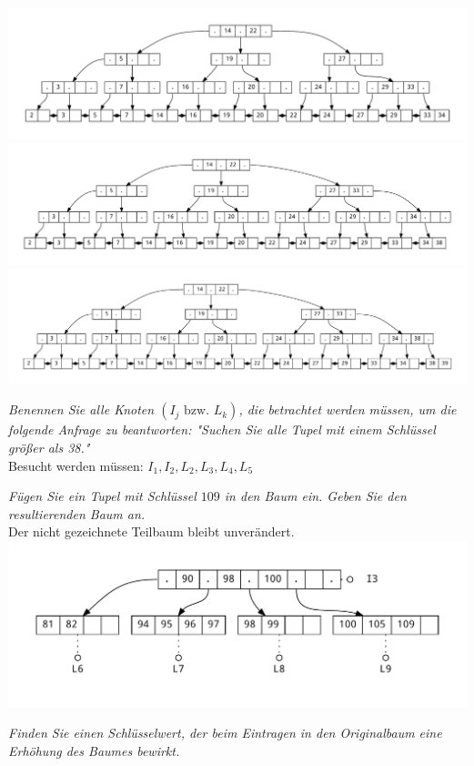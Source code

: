 \documentclass{uni_tue_template}
\begin{document}
  \includegraphics[scale=0.4]{./dot/A1_1-14.pdf}\\
  \includegraphics[scale=0.4]{./dot/A1_1-15.pdf}\\
  \includegraphics[scale=0.4]{./dot/A1_1-16.pdf}
\subExEnd{}
%
\newpage 
%
\exercise{}
  \item \emph{Benennen Sie alle Knoten $(I_j\text{ bzw. }L_k)$, die betrachtet werden müssen, um die folgende Anfrage zu beantworten: "Suchen Sie alle Tupel mit einem Schlüssel größer als 38."}\\
  Besucht werden müssen: $I_1, I_2, L_2, L_3, L_4, L_5$
  \item \emph{Fügen Sie ein Tupel mit Schlüssel $109$ in den Baum ein. Geben Sie den resultierenden Baum an.}\\
  Der nicht gezeichnete Teilbaum bleibt unverändert.\\
  \includegraphics[scale=0.4]{./dot/A2_2.pdf}
  \item \emph{Finden Sie einen Schlüsselwert, der beim Eintragen in den Originalbaum eine Erhöhung des Baumes bewirkt.}\\
\end{document}
